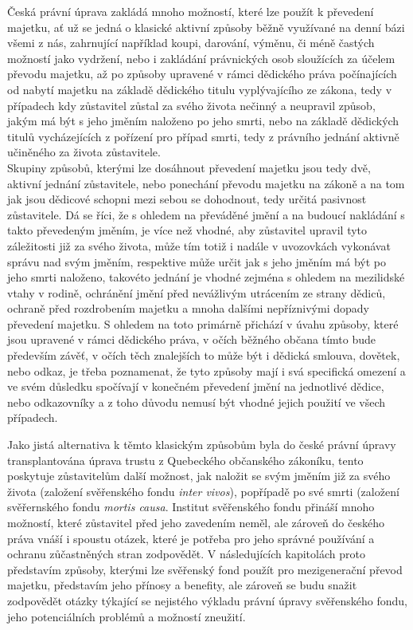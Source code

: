 \documentclass{article}
\begin{document}
Česká právní úprava zakládá mnoho možností, které lze použít k převedení majetku, ať už se jedná o klasické aktivní způsoby běžně využívané na denní bázi všemi z nás, zahrnující například koupi, darování, výměnu, či méně častých možností jako vydržení, nebo i zakládání právnických osob sloužících za účelem převodu majetku, až po způsoby upravené v rámci dědického práva počínajících od nabytí majetku na základě dědického titulu vyplývajícího ze zákona, tedy v případech kdy zůstavitel zůstal za svého života nečinný a neupravil způsob, jakým má být s jeho jměním naloženo po jeho smrti, nebo na základě dědických titulů vycházejících z pořízení pro případ smrti, tedy z právního jednání aktivně učiněného za života zůstavitele. \\

Skupiny způsobů, kterými lze dosáhnout převedení majetku jsou tedy dvě, aktivní jednání zůstavitele, nebo ponechání převodu majetku na zákoně a na tom jak jsou dědicové schopni mezi sebou se dohodnout, tedy určitá pasivnost zůstavitele. Dá se říci, že s ohledem na převáděné jmění a na budoucí nakládání s takto převedeným jměním, je více než vhodné, aby zůstavitel upravil tyto záležitosti již za svého života, může tím totiž i nadále v uvozovkách vykonávat správu nad svým jměním, respektive může určit jak s jeho jměním má být po jeho smrti naloženo, takovéto jednání je vhodné zejména s ohledem na mezilidské vtahy v rodině, ochránění jmění před nevážlivým utrácením ze strany dědiců, ochraně před rozdrobením majetku a mnoha dalšími nepříznivými dopady převedení majetku. S ohledem na toto primárně přichází v úvahu způsoby, které jsou upravené v rámci dědického práva, v očích běžného občana tímto bude především závěť, v očích těch znalejších to může být i dědická smlouva, dovětek, nebo odkaz, je třeba poznamenat, že tyto způsoby mají i svá specifická omezení a ve svém důsledku spočívají v konečném převedení jmění na jednotlivé dědice, nebo odkazovníky a z toho důvodu nemusí být vhodné jejich použití ve všech případech. \\

\newpage
\thispagestyle{smallertextinheader}

Jako jistá alternativa k těmto klasickým způsobům byla do české právní úpravy transplantována úprava trustu z Quebeckého občanského zákoníku, tento poskytuje zůstavitelům další možnost, jak naložit se svým jměním již za svého života (založení svěřenského fondu \textit{inter vivos}), popřípadě po své smrti (založení svěřernského fondu \textit{mortis causa}. Institut svěřenského fondu přináší mnoho možností, které zůstavitel před jeho zavedením neměl, ale zároveň do českého práva vnáší i spoustu otázek, které je potřeba pro jeho správné používání a ochranu zůčastněných stran zodpovědět. V následujících kapitolách proto představím způsoby, kterými lze svěřenský fond použít pro mezigenerační převod majetku, představím jeho přínosy a benefity, ale zároveň se budu snažit zodpovědět otázky týkající se nejistého výkladu právní úpravy svěřenského fondu, jeho potenciálních problémů a možností zneužití. \\
\end{document}
